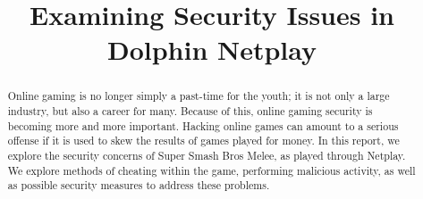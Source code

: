 \documentclass[conference]{IEEEtran}
\begin{document}
%
\title{Examining Security Issues in Dolphin Netplay}


\author{
\and
{}
}



\maketitle






%
\IEEEpeerreviewmaketitle

\begin{abstract}
   Online gaming is no longer simply a past-time for the youth; it is not only a large industry, but also a career for many.
   Because of this, online gaming security is becoming more and more important.
   Hacking online games can amount to a serious offense if it is used to skew the results of games played for money.
   In this report, we explore the security concerns of Super Smash Bros Melee, as played through Netplay.
   We explore methods of cheating within the game, performing malicious activity, as well as possible security measures to address these problems.
\end{abstract}
\end{document}
